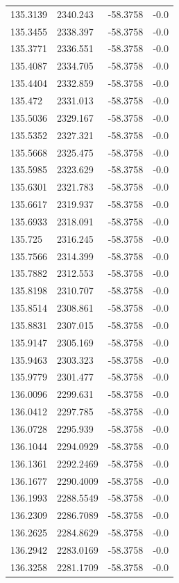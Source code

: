 \begin{table}[H]
\begin{tabular}{llll}
135.3139 & 2340.243 & -58.3758 & -0.0 \\
135.3455 & 2338.397 & -58.3758 & -0.0 \\
135.3771 & 2336.551 & -58.3758 & -0.0 \\
135.4087 & 2334.705 & -58.3758 & -0.0 \\
135.4404 & 2332.859 & -58.3758 & -0.0 \\
135.472 & 2331.013 & -58.3758 & -0.0 \\
135.5036 & 2329.167 & -58.3758 & -0.0 \\
135.5352 & 2327.321 & -58.3758 & -0.0 \\
135.5668 & 2325.475 & -58.3758 & -0.0 \\
135.5985 & 2323.629 & -58.3758 & -0.0 \\
135.6301 & 2321.783 & -58.3758 & -0.0 \\
135.6617 & 2319.937 & -58.3758 & -0.0 \\
135.6933 & 2318.091 & -58.3758 & -0.0 \\
135.725 & 2316.245 & -58.3758 & -0.0 \\
135.7566 & 2314.399 & -58.3758 & -0.0 \\
135.7882 & 2312.553 & -58.3758 & -0.0 \\
135.8198 & 2310.707 & -58.3758 & -0.0 \\
135.8514 & 2308.861 & -58.3758 & -0.0 \\
135.8831 & 2307.015 & -58.3758 & -0.0 \\
135.9147 & 2305.169 & -58.3758 & -0.0 \\
135.9463 & 2303.323 & -58.3758 & -0.0 \\
135.9779 & 2301.477 & -58.3758 & -0.0 \\
136.0096 & 2299.631 & -58.3758 & -0.0 \\
136.0412 & 2297.785 & -58.3758 & -0.0 \\
136.0728 & 2295.939 & -58.3758 & -0.0 \\
136.1044 & 2294.0929 & -58.3758 & -0.0 \\
136.1361 & 2292.2469 & -58.3758 & -0.0 \\
136.1677 & 2290.4009 & -58.3758 & -0.0 \\
136.1993 & 2288.5549 & -58.3758 & -0.0 \\
136.2309 & 2286.7089 & -58.3758 & -0.0 \\
136.2625 & 2284.8629 & -58.3758 & -0.0 \\
136.2942 & 2283.0169 & -58.3758 & -0.0 \\
136.3258 & 2281.1709 & -58.3758 & -0.0 \\

\end{tabular}
\end{table}
